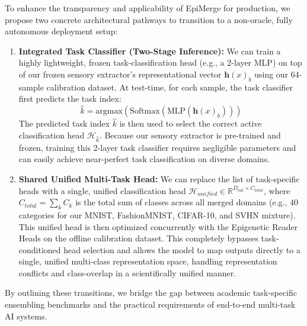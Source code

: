 To enhance the transparency and applicability of EpiMerge for production, we propose two concrete architectural pathways to transition to a non-oracle, fully autonomous deployment setup:
\begin{enumerate}
    \item \textbf{Integrated Task Classifier (Two-Stage Inference):} We can train a highly lightweight, frozen task-classification head (e.g., a 2-layer MLP) on top of our frozen sensory extractor's representational vector $\mathbf{h}(x)_b$ using our 64-sample calibration dataset. At test-time, for each sample, the task classifier first predicts the task index:
    \begin{equation}
        \hat{k} = \text{argmax}\left(\text{Softmax}\left(\text{MLP}\left(\mathbf{h}(x)_b\right)\right)\right)
    \end{equation}
    The predicted task index $\hat{k}$ is then used to select the correct active classification head $\mathcal{H}_{\hat{k}}$. Because our sensory extractor is pre-trained and frozen, training this 2-layer task classifier requires negligible parameters and can easily achieve near-perfect task classification on diverse domains.
    \item \textbf{Shared Unified Multi-Task Head:} We can replace the list of task-specific heads with a single, unified classification head $\mathcal{H}_{unified} \in \mathbb{R}^{D_{out} \times C_{total}}$, where $C_{total} = \sum_k C_k$ is the total sum of classes across all merged domains (e.g., 40 categories for our MNIST, FashionMNIST, CIFAR-10, and SVHN mixture). This unified head is then optimized concurrently with the Epigenetic Reader Heads on the offline calibration dataset. This completely bypasses task-conditioned head selection and allows the model to map outputs directly to a single, unified multi-class representation space, handling representation conflicts and class-overlap in a scientifically unified manner.
\end{enumerate}
By outlining these transitions, we bridge the gap between academic task-specific ensembling benchmarks and the practical requirements of end-to-end multi-task AI systems.
